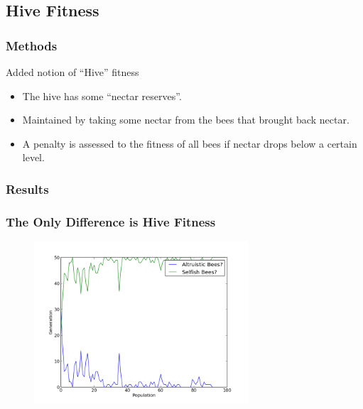 \documentclass{beamer}
\begin{document}
    \subsection{Hive Fitness} %
    \label{sub:hive_fitness}
      \subsubsection{Methods} %
      \label{ssub:methods}
        \begin{frame}{Added notion of ``Hive'' fitness}
          \begin{itemize}
            \item The hive has some ``nectar reserves''.
            \item Maintained by taking some nectar from the bees that brought 
                  back nectar.
            \item A penalty is assessed to the fitness of all bees if nectar 
                  drops below a certain level.
          \end{itemize}
        \end{frame}

      \subsubsection{Results} %
      \label{ssub:results}

        \begin{frame}[t]\frametitle{The Only Difference is Hive Fitness}
          \begin{figure}
          \includegraphics[width=8cm]{results/hive_influenced_bees.png}
          \end{figure}
        \end{frame}
\end{document}
